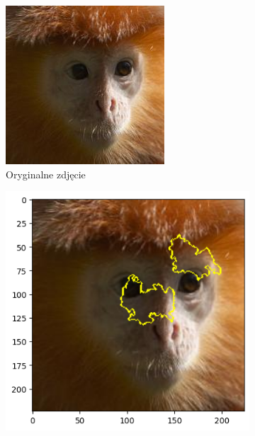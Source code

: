 \begin{figure}[h]
	\centering
	\begin{subfigure}[b]{0.3\textwidth}
		\includegraphics[width=.9\textwidth]{img/examples/appendix/n02488291_05090}
		\caption{Oryginalne zdjęcie}  \label{}
	\end{subfigure}
	\begin{subfigure}[b]{0.3\textwidth}
		\centering\includegraphics[width=.9\textwidth]{img/examples/appendix/n02488291_05090_lime}

\end{subfigure}
\end{figure}
